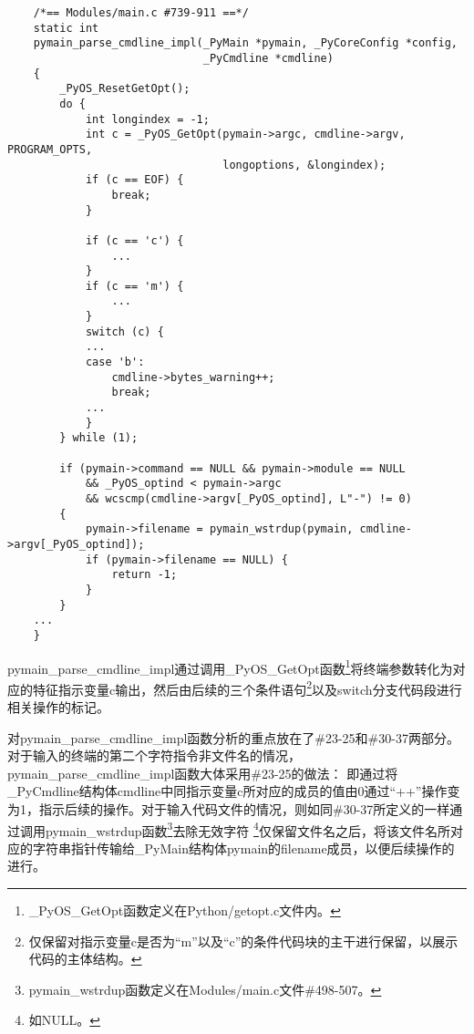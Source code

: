 \documentclass[UTF8]{book}
\begin{document}
\begin{lstlisting}
    /*== Modules/main.c #739-911 ==*/
    static int
    pymain_parse_cmdline_impl(_PyMain *pymain, _PyCoreConfig *config,
                              _PyCmdline *cmdline)
    {
        _PyOS_ResetGetOpt();
        do {
            int longindex = -1;
            int c = _PyOS_GetOpt(pymain->argc, cmdline->argv, PROGRAM_OPTS,
                                 longoptions, &longindex);
            if (c == EOF) {
                break;
            }

            if (c == 'c') {
                ...
            }
            if (c == 'm') {
                ...
            }
            switch (c) {
            ...
            case 'b':
                cmdline->bytes_warning++;
                break;
            ...
            }
        } while (1);

        if (pymain->command == NULL && pymain->module == NULL
            && _PyOS_optind < pymain->argc
            && wcscmp(cmdline->argv[_PyOS_optind], L"-") != 0)
        {
            pymain->filename = pymain_wstrdup(pymain, cmdline->argv[_PyOS_optind]);
            if (pymain->filename == NULL) {
                return -1;
            }
        }
    ...
    }

\end{lstlisting}\par
pymain\_parse\_cmdline\_impl通过调用\_PyOS\_GetOpt函数\footnote[1]{\_PyOS\_GetOpt函数定义在Python/getopt.c文件内。}将终端参数转化为对应的特征指示变量c输出，然后由后续的三个条件语句\footnote[2]{
仅保留对指示变量c是否为“m”以及“c”的条件代码块的主干进行保留，以展示代码的主体结构。
}以及switch分支代码段进行相关操作的标记。\par
对pymain\_parse\_cmdline\_impl函数分析的重点放在了\#23-25和\#30-37两部分。对于输入的终端的第二个字符指令非文件名的情况，pymain\_parse\_cmdline\_impl函数大体采用\#23-25的做法：
即通过将\_PyCmdline结构体cmdline中同指示变量c所对应的成员的值由0通过“++”操作变为1，指示后续的操作。对于输入代码文件的情况，则如同\#30-37所定义的一样通过调用pymain\_wstrdup函数\footnote[3]{pymain\_wstrdup函数定义在Modules/main.c文件\#498-507。}去除无效字符
\footnote[4]{如NULL。}仅保留文件名之后，将该文件名所对应的字符串指针传输给\_PyMain结构体pymain的filename成员，以便后续操作的进行。\par
\end{document}
